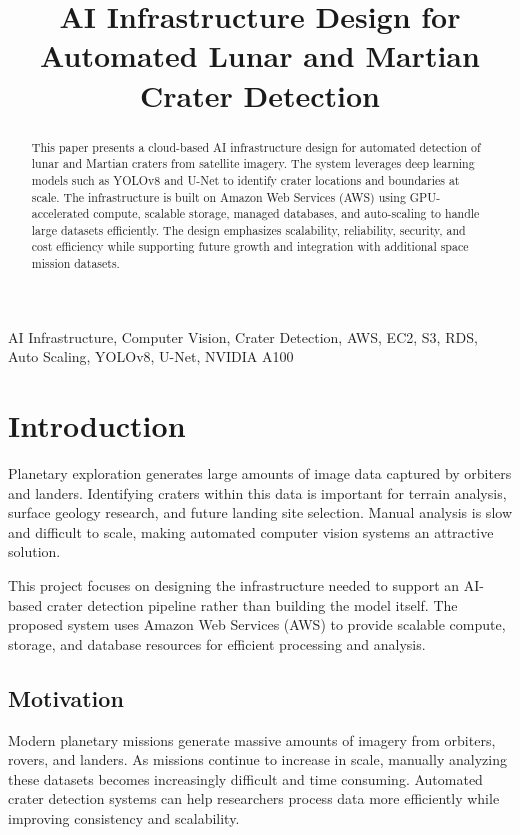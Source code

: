 \documentclass[conference]{IEEEtran}
\title{AI Infrastructure Design for Automated Lunar and Martian Crater Detection}
\author{
	\IEEEauthorblockN{Scott Nguyen}
	\IEEEauthorblockA{
		University of New Mexico \\
		snguyen9@unm.edu
	}
}
\begin{document}
	
	\maketitle
	
	\begin{abstract}
		This paper presents a cloud-based AI infrastructure design for automated detection of lunar and Martian craters from satellite imagery. The system leverages deep learning models such as YOLOv8 and U-Net to identify crater locations and boundaries at scale. The infrastructure is built on Amazon Web Services (AWS) using GPU-accelerated compute, scalable storage, managed databases, and auto-scaling to handle large datasets efficiently. The design emphasizes scalability, reliability, security, and cost efficiency while supporting future growth and integration with additional space mission datasets.
	\end{abstract}
	
	\begin{IEEEkeywords}
		AI Infrastructure, Computer Vision, Crater Detection, AWS, EC2, S3, RDS, Auto Scaling, YOLOv8, U-Net, NVIDIA A100
	\end{IEEEkeywords}
	
	\section{Introduction}
	
	Planetary exploration generates large amounts of image data captured by orbiters and landers. Identifying craters within this data is important for terrain analysis, surface geology research, and future landing site selection. Manual analysis is slow and difficult to scale, making automated computer vision systems an attractive solution.
	
	This project focuses on designing the infrastructure needed to support an AI-based crater detection pipeline rather than building the model itself. The proposed system uses Amazon Web Services (AWS) to provide scalable compute, storage, and database resources for efficient processing and analysis.
	
	\subsection{Motivation}
	
	Modern planetary missions generate massive amounts of imagery from orbiters, rovers, and landers. As missions continue to increase in scale, manually analyzing these datasets becomes increasingly difficult and time consuming. Automated crater detection systems can help researchers process data more efficiently while improving consistency and scalability.
	
\end{document}
